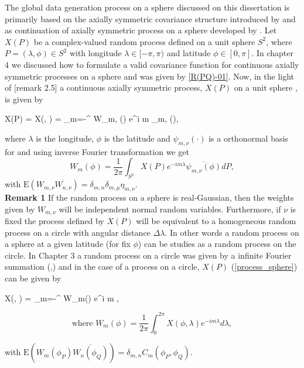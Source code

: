 

The global data generation process on a sphere discussed on this dissertation is primarily based on the axially symmetric covariance structure introduced by \cite{Jones1963} and as continuation of axially symmetric process on a sphere developed by \cite{Huang2012}.  Let $X(P)$ be a complex-valued random process defined on a unit sphere $S^2$, where $P = (\lambda, \phi) \in S^2$ with longitude $\lambda \in [-\pi, \pi)$ and latitude $\phi \in [0, \pi]$. In chapter 4 we discussed how to formulate a valid covariance function for continuous axially symmetric processes on a sphere and was given by \ref{R(PQ)-01}. Now, in the light of \cite{Huang2012}[remark 2.5] a continuous axially symmetric process, $X(P)$ on a unit sphere , is given by
		
	\beq \label{process_sphere}
	X(P) = X(\phi, \lambda) = \sum_{m=-\infty}^{\infty} W_{m, \nu}(\phi) e^{i m \lambda}\psi_{m,\nu} (\phi),
	\eeq
		
	where $\lambda$ is the longitude, $\phi$ is the latitude and $\psi_{m,\nu}(\cdot)$ is a orthonormal basis for \Cm and using inverse Fourier transformation we get
	\[
		W_m(\phi) = \frac{1}{2\pi} \int_{S^2} X(P) e^{-im\lambda} \overline{\psi_{m,\nu} (\phi)} dP,
	\]
	with $\mbox{E}(W_{m, \nu} \overline{W_{n,\nu}}) = \delta_{m,n}\delta_{m,\mu}\eta_{m,\nu}$. \\
		
	{\bf Remark 1} If the random process on a sphere is real-Gaussian, then the weights given by $W_{m,\nu}$ will be independent normal random variables. Furthermore, if $\nu$ is fixed the process defined by $X(P)$ will be equivalent to a homogeneous random process on a circle with angular distance $\Delta \lambda$. In other words a random process on a sphere at a given latitude (for fix $\phi$) can be studies as a random process on the circle. In Chapter 3 \label{process_circle} a random process on a circle was given by a infinite Fourier summation (\cite{Roy1972},\cite{DUFOUR1976107}) and in the case of a process on a circle, $X(P)$ (\ref{process_sphere}) can be given by   
		
	\beq \label{eq:sym_process} 
	X(\phi, \lambda) = \sum_{m=-\infty}^{\infty} W_m(\phi) e^{i m \lambda},
	\eeq
		
	\[
		\mbox{where } W_m(\phi) = \frac{1}{2\pi} \int_0^{2\pi} X(\phi, \lambda) e^{-i m \lambda} d \lambda,
	\]
		
	with $\mbox{E}(W_m(\phi_P) \overline{W_n(\phi_Q)}) = \delta_{m,n} C_m(\phi_P, \phi_Q)$. \\
	
